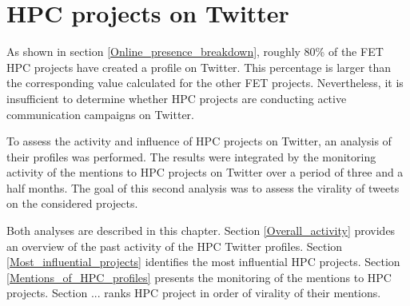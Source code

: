 \chapter{HPC projects on Twitter} \label{HPC_projects_on_Twitter}
As shown in section \ref{Online_presence_breakdown}, roughly 80\% of the FET HPC projects have created a profile on Twitter. This percentage is larger than the corresponding value calculated for the other FET projects. Nevertheless, it is insufficient to determine whether HPC projects are conducting active communication campaigns on Twitter. 

To assess the activity and influence of HPC projects on Twitter, an analysis of their profiles was performed. The results were integrated by the monitoring activity of the mentions to HPC projects on Twitter over a period of three and a half months. The goal of this second analysis was to assess the virality of tweets on the considered projects.  

Both analyses are described in this chapter. Section \ref{Overall_activity} provides an overview of the past activity of the HPC Twitter profiles. Section \ref{Most_influential_projects} identifies the most influential HPC projects. Section \ref{Mentions_of_HPC_profiles} presents the monitoring of the mentions to HPC projects. Section ... ranks HPC project in order of virality of their mentions. 

